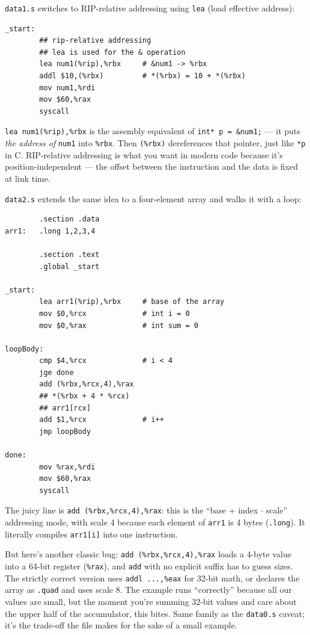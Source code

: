 \documentclass[11pt]{article}
\begin{document}
\texttt{data1.s} switches to RIP-relative addressing using
\texttt{lea} (load effective address):

\begin{lstlisting}
_start:
        ## rip-relative addressing
        ## lea is used for the & operation
        lea num1(%rip),%rbx     # &num1 -> %rbx
        addl $10,(%rbx)         # *(%rbx) = 10 + *(%rbx)
        mov num1,%rdi
        mov $60,%rax
        syscall
\end{lstlisting}

\texttt{lea num1(\%rip),\%rbx} is the assembly equivalent of
\texttt{int* p = \&num1;} --- it puts \emph{the address of}
\texttt{num1} into \texttt{\%rbx}. Then \texttt{(\%rbx)} dereferences
that pointer, just like \texttt{*p} in C. RIP-relative addressing is
what you want in modern code because it's position-independent ---
the offset between the instruction and the data is fixed at link time.

\texttt{data2.s} extends the same idea to a four-element array and
walks it with a loop:

\begin{lstlisting}
        .section .data
arr1:   .long 1,2,3,4

        .section .text
        .global _start

_start:
        lea arr1(%rip),%rbx     # base of the array
        mov $0,%rcx             # int i = 0
        mov $0,%rax             # int sum = 0

loopBody:
        cmp $4,%rcx             # i < 4
        jge done
        add (%rbx,%rcx,4),%rax
        ## *(%rbx + 4 * %rcx)
        ## arr1[rcx]
        add $1,%rcx             # i++
        jmp loopBody

done:
        mov %rax,%rdi
        mov $60,%rax
        syscall
\end{lstlisting}

The juicy line is \texttt{add (\%rbx,\%rcx,4),\%rax}: this is the
``base + index $\cdot$ scale'' addressing mode, with scale 4 because
each element of \texttt{arr1} is 4 bytes (\texttt{.long}). It
literally compiles \texttt{arr1[i]} into one instruction.

But here's another classic bug: \texttt{add (\%rbx,\%rcx,4),\%rax}
loads a 4-byte value into a 64-bit register (\texttt{\%rax}), and
\texttt{add} with no explicit suffix has to guess sizes. The strictly
correct version uses \texttt{addl ...,\%eax} for 32-bit math, or
declares the array as \texttt{.quad} and uses scale 8. The example
runs ``correctly'' because all our values are small, but the moment
you're summing 32-bit values and care about the upper half of the
accumulator, this bites. Same family as the \texttt{data0.s} caveat;
it's the trade-off the file makes for the sake of a small example.
\end{document}
